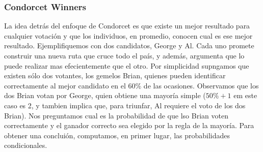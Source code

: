  \subsubsection{Condorcet Winners}
 
 La idea detrás del enfoque de Condorcet es que existe un mejor resultado para cualquier votación y que los individuos, en promedio, conocen cual es ese mejor resultado.
 Ejemplifiquemos con dos candidatos, George y Al. Cada uno promete construir una nueva ruta que cruce todo el país, y además, argumenta que lo puede realizar mas efecientemente que el otro. Por simplicidad supngamos que existen sólo dos votantes, los gemelos Brian, quienes pueden identificar correctamente al mejor candidato en el 60\% de las ocasiones. Observamos que los dos Brian votan por George, quien obtiene una mayoría simple ($50\%+1$ em este caso es 2, y tambien implica que, para triunfar, Al requiere el voto de los dos Brian). Nos preguntamos cual es la probabilidad de que lso Brian voten correctamente y el ganador correcto sea elegido por la regla de la mayoría. Para obtener una concluión, computamos, en primer lugar, las probabilidades condicionales.
